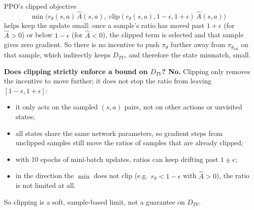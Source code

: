 \documentclass[11pt]{article}
\newcommand{\piold}{\pi_{\theta_{\mathrm{old}}}}
\newcommand{\Ahat}{\hat{A}}
\begin{document}
\begin{enumerate}[label=(\alph*)]
        PPO's clipped objective
        \[
          \min\!\big(r_\theta(s,a)\,\Ahat(s,a),\;
          \mathrm{clip}(r_\theta(s,a), 1-\epsilon, 1+\epsilon)\,\Ahat(s,a)\big)
        \]
        helps keep the update small: once a sample's ratio has moved past $1+\epsilon$ (for
        $\Ahat > 0$) or below $1-\epsilon$ (for $\Ahat < 0$), the clipped term is selected and that sample
        gives zero gradient. So there is no incentive to push $\pi_\theta$ further away from $\piold$ on
        that sample, which indirectly keeps $D_{TV}$, and therefore the state mismatch, small.

        \textbf{Does clipping strictly enforce a bound on $D_{TV}$? No.} Clipping only removes the
        incentive to move further; it does not stop the ratio from leaving $[1-\epsilon, 1+\epsilon]$:
        \begin{itemize}
          \item it only acts on the sampled $(s,a)$ pairs, not on other actions or unvisited states;
          \item all states share the same network parameters, so gradient steps from unclipped samples
                still move the ratios of samples that are already clipped;
          \item with 10 epochs of mini-batch updates, ratios can keep drifting past $1\pm\epsilon$;
          \item in the direction the $\min$ does not clip (e.g.\ $r_\theta < 1-\epsilon$ with
                $\Ahat > 0$), the ratio is not limited at all.
        \end{itemize}
        So clipping is a soft, sample-based limit, not a guarantee on $D_{TV}$.
\end{enumerate}
\end{document}
